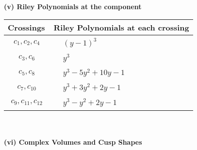 \documentclass[1p]{elsarticle_modified}
\theoremstyle{definition}
\begin{document}
\newpage\renewcommand{\arraystretch}{1}
\flushleft \textbf{(v) Riley Polynomials at the component}\newline \\
\begin{tabular}{m{50pt}|m{274pt}}
Crossings & \hspace{64pt}Riley Polynomials at each crossing \\
\hline $$\begin{aligned}c_{1},c_{2},c_{4}\end{aligned}$$&$\begin{aligned}
&(y-1)^3
\end{aligned}$\\
\hline $$\begin{aligned}c_{3},c_{6}\end{aligned}$$&$\begin{aligned}
&y^3
\end{aligned}$\\
\hline $$\begin{aligned}c_{5},c_{8}\end{aligned}$$&$\begin{aligned}
&y^3-5 y^2+10 y-1
\end{aligned}$\\
\hline $$\begin{aligned}c_{7},c_{10}\end{aligned}$$&$\begin{aligned}
&y^3+3 y^2+2 y-1
\end{aligned}$\\
\hline $$\begin{aligned}c_{9},c_{11},c_{12}\end{aligned}$$&$\begin{aligned}
&y^3- y^2+2 y-1
\end{aligned}$\\
\hline
\end{tabular}\\~\\
\newpage\flushleft \textbf{(vi) Complex Volumes and Cusp Shapes}
\end{document}
